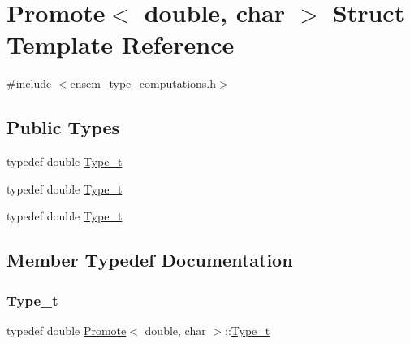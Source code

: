 \hypertarget{structPromote_3_01double_00_01char_01_4}{}\section{Promote$<$ double, char $>$ Struct Template Reference}
\label{structPromote_3_01double_00_01char_01_4}


{\ttfamily \#include $<$ensem\+\_\+type\+\_\+computations.\+h$>$}

\subsection*{Public Types}
\begin{DoxyCompactItemize}
\item 
typedef double \mbox{\hyperlink{structPromote_3_01double_00_01char_01_4_a9eda575d7d1de94d1933944cf245dc9f}{Type\+\_\+t}}
\item 
typedef double \mbox{\hyperlink{structPromote_3_01double_00_01char_01_4_a9eda575d7d1de94d1933944cf245dc9f}{Type\+\_\+t}}
\item 
typedef double \mbox{\hyperlink{structPromote_3_01double_00_01char_01_4_a9eda575d7d1de94d1933944cf245dc9f}{Type\+\_\+t}}
\end{DoxyCompactItemize}


\subsection{Member Typedef Documentation}
\mbox{\label{structPromote_3_01double_00_01char_01_4_a9eda575d7d1de94d1933944cf245dc9f}} 
\subsubsection{\texorpdfstring{Type\_t}{Type\_t}\hspace{0.1cm}{\footnotesize\ttfamily [1/3]}}
{\footnotesize\ttfamily typedef double \mbox{\hyperlink{structPromote}{Promote}}$<$ double, char $>$\+::\mbox{\hyperlink{structPromote_3_01double_00_01char_01_4_a9eda575d7d1de94d1933944cf245dc9f}{Type\+\_\+t}}}

\mbox{\label{structPromote_3_01double_00_01char_01_4_a9eda575d7d1de94d1933944cf245dc9f}} 
